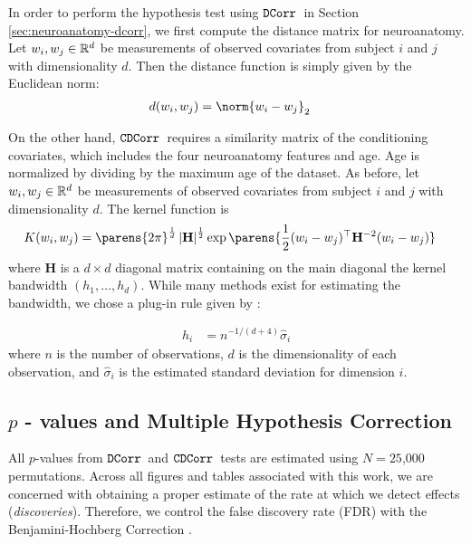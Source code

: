In order to perform the hypothesis test using $\operatorname{\mathtt{DCorr}}$\ in Section \ref{sec:neuroanatomy-dcorr}, we first compute the distance matrix for neuroanatomy. Let $w_i, w_j \in \mathbb{R}^d$ be measurements of observed covariates from subject $i$ and $j$ with dimensionality $d$. Then the distance function is simply given by the Euclidean norm:
 \begin{align*}
     d(w_i, w_j) &= \norm{w_i- w_j}_2
 \end{align*}

On the other hand, $\operatorname{\mathtt{CDCorr}}$\ requires a similarity matrix of the conditioning covariates, which includes the four neuroanatomy features and age. Age is normalized by dividing by the maximum age of the dataset. As before, let $w_i, w_j \in \mathbb{R}^d$ be measurements of observed covariates from subject $i$ and $j$ with dimensionality $d$. The kernel function is
\begin{align*}
    K(w_i, w_j) &= \parens{2\pi}^{\frac{1}{d}}\abs{\mathbf{H}}^{\frac{1}{2}}\exp\parens{\frac{1}{2}(w_i - w_j)^\top \mathbf H^{-2}(w_i - w_j)}
\end{align*}
where $\mathbf H$ is a $d \times d$ diagonal matrix containing on the main diagonal the kernel bandwidth $(h_1, \ldots, h_d)$. While many methods exist for estimating the bandwidth, we chose a plug-in rule given by \cite{scott2015multivariate}:

\begin{align*}
    h_i &= n^{-1/(d+4)} \hat\sigma_i
\end{align*}
where $n$ is the number of observations, $d$ is the dimensionality of each observation, and $\hat\sigma_i$ is the estimated standard deviation for dimension $i$. 

\subsection{$p$ - values and Multiple Hypothesis Correction}
All $p$-values from $\operatorname{\mathtt{DCorr}}$\ and $\operatorname{\mathtt{CDCorr}}$\ tests are estimated using $N=25$,$000$ permutations. Across all figures and tables associated with this work, we are concerned with obtaining a proper estimate of the rate at which we detect effects (\textit{discoveries}). Therefore, we control the false discovery rate (FDR) with the Benjamini-Hochberg Correction \cite{benjamini1995controlling}. 

